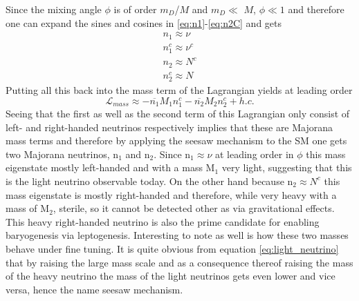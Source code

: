 Since the mixing angle $\phi$ is of order $m_D$/$M$ and $m_D\ll$ $M$, $\phi\ll1$ and therefore one can expand the sines and cosines in \eqref{eq:n1}-\eqref{eq:n2C} and gets
\begin{align}
	n_{1}\approx\nu\\
	n_{1}^c\approx\nu^c\\
	n_{2}\approx N^c\\
	n_{2}^c\approx N
\end{align}
Putting all this back into the mass term of the Lagrangian yields at leading order
\begin{equation}
	\mathcal{L}_{mass}\approx-\overline{n_1}M_1n_1^c-\overline{n_2}M_2n_2^c+h.c.
\end{equation}
Seeing that the first as well as the second term of this Lagrangian only consist of left- and right-handed neutrinos respectively implies that these are Majorana mass terms and therefore by applying the seesaw mechanism to the SM one gets two Majorana neutrinos, n$_1$ and n$_2$. \newline\indent
Since n$_{1}\approx\nu$ at leading order in $\phi$ this mass eigenstate mostly left-handed and with a mass M$_1$ very light, suggesting that this is the light neutrino observable today.\newline\indent
On the other hand because n$_{2}\approx N^c$ this mass eigenstate is mostly right-handed and therefore, while very heavy with a mass of M$_2$, sterile, so it cannot be detected other as via gravitational effects. This heavy right-handed neutrino is also the prime candidate for enabling baryogenesis via leptogenesis. \newline\indent
Interesting to note as well is how these two masses behave under fine tuning. It is quite obvious from equation \eqref{eq:light_neutrino} that by raising the large mass scale and as a consequence thereof raising the mass of the heavy neutrino the mass of the light neutrinos gets even lower and vice versa, hence the name seesaw mechanism. 
